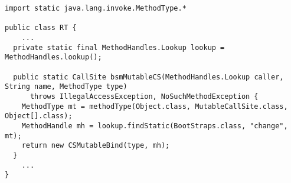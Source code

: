 {\tiny \begin{verbatim}
import static java.lang.invoke.MethodType.*

public class RT {
    ...
  private static final MethodHandles.Lookup lookup = MethodHandles.lookup();

  public static CallSite bsmMutableCS(MethodHandles.Lookup caller, String name, MethodType type)
      throws IllegalAccessException, NoSuchMethodException {
    MethodType mt = methodType(Object.class, MutableCallSite.class, Object[].class);
    MethodHandle mh = lookup.findStatic(BootStraps.class, "change", mt);
    return new CSMutableBind(type, mh);
  }
    ...
}
\end{verbatim} }